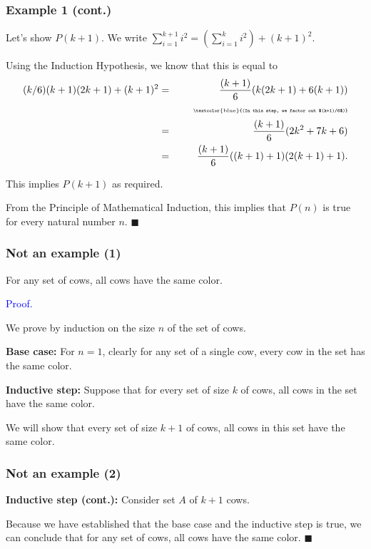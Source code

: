 \begin{frame}\frametitle{Example 1 (cont.)}
  Let's show $P(k+1)$.  We write
  $ \sum_{i=1}^{k+1} i^2 = \left(\sum_{i=1}^k i^2\right) + (k+1)^2 .$
  \vspace{0.15in}

  Using the Induction Hypothesis, we know that this is equal to
  {\small
  \begin{eqnarray*}
    (k/6)(k+1)(2k+1) + (k+1)^2 &=& \frac{(k+1)}{6}(k(2k+1)+6(k+1)) \\
    && \mbox{\tiny \ \ \ \ \ \ \textcolor{blue}{(In this step, we factor out $(k+1)/6$)}} \\
    &=& \frac{(k+1)}{6}(2k^2+7k+6) \\
    &=& \frac{(k+1)}{6}((k+1)+1)(2(k+1)+1).
  \end{eqnarray*}
  }
  
  This implies $P(k+1)$ as required.
  
  From the Principle of Mathematical Induction, this implies that
  $P(n)$ is true for every natural number $n$. $\blacksquare$
\end{frame}

\begin{frame}\frametitle{Not an example (1)}
  \begin{theorem}
    For any set of cows, all cows have the same color.
  \end{theorem}
  \textcolor{blue}{Proof.}

  We prove by induction on the size $n$ of the set of cows.
  
  {\bf Base case:} For $n=1$, clearly for any set of a single cow,
  every cow in the set has the same color.
  
  {\bf Inductive step:} Suppose that for every set of size $k$ of
  cows, all cows in the set have the same color.
  
  We will show that every set of size $k+1$ of cows, all cows in
  this set have the same color.
\end{frame}

\begin{frame}\frametitle{Not an example (2)}
  {\bf Inductive step (cont.):} Consider set $A$ of $k+1$ cows.

  \vspace{2.2in}
  \pause

  Because we have established that the base case and the inductive
  step is true, we can conclude that for any set of cows, all cows
  have the same color. $\blacksquare$
  
\end{frame}

